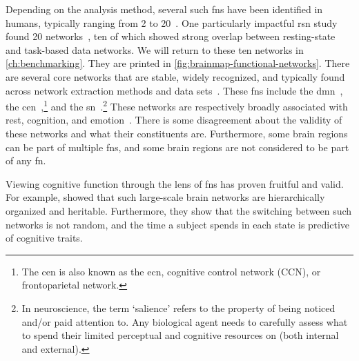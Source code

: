 Depending on the analysis method, several such \glspl{fn} have been identified in humans, typically ranging from 2 to 20~\parencite{Yeo2011, Heine2012, Glomb2017}.
One particularly impactful \gls{rsn} study found 20 networks~\parencite{Smith2009, Laird2011}, ten of which showed strong overlap between resting-state and task-based data networks.
We will return to these ten networks in \cref{ch:benchmarking}.
They are printed in \cref{fig:brainmap-functional-networks}.
%
There are several core networks that are stable, widely recognized, and typically found across network extraction methods and data sets~\parencite{Uddin2019}.
These \glspl{fn} include the \gls{dmn}~\parencite{Raichle2001, Raichle2007, Vatansever2015}, the \gls{cen}~\parencite{Rogers2004},\footnote{The \gls{cen} is also known as the \gls{ecn}, cognitive control network (CCN), or frontoparietal network.} and the \gls{sn}~\parencite{Drevets2000, Seeley2007}.\footnote{In neuroscience, the term `salience' refers to the property of being noticed and/or paid attention to. Any biological agent needs to carefully assess what to spend their limited perceptual and cognitive resources on (both internal and external).}
These networks are respectively broadly associated with rest, cognition, and emotion~\parencite{Uddin2019}.
%
There is some disagreement about the validity of these networks and what their constituents are.
Furthermore, some brain regions can be part of multiple \glspl{fn}, and some brain regions are not considered to be part of any \gls{fn}.

Viewing cognitive function through the lens of \glspl{fn} has proven fruitful and valid.
For example, \textcite{Vidaurre2017} showed that such large-scale brain networks are hierarchically organized and heritable.
Furthermore, they show that the switching between such networks is not random, and the time a subject spends in each state is predictive of cognitive traits.
